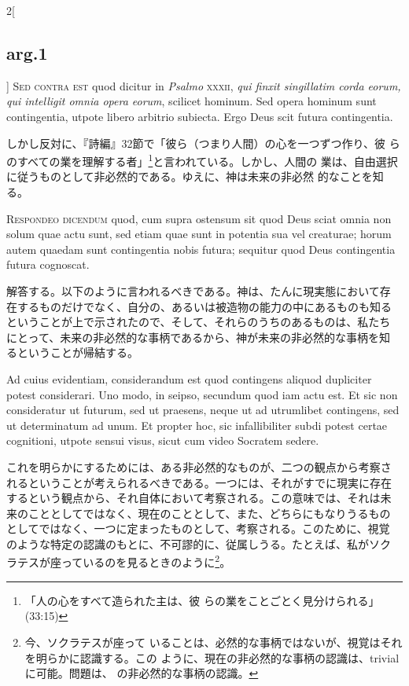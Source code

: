 \documentclass[paper=a4paper,fontsize=10pt,jafontsize=9pt,titlepage]{jlreq}
\begin{document}
\begin{paracol}{2}[\subsection{arg.1}]
{\scshape Sed contra est} quod dicitur in {\itshape Psalmo} {\scshape
xxxii}, {\itshape qui finxit singillatim corda eorum, qui intelligit
omnia opera eorum}, scilicet hominum. Sed opera hominum sunt
contingentia, utpote libero arbitrio subiecta. Ergo Deus scit futura
contingentia.

\switchcolumn

しかし反対に、『詩編』32節で「彼ら（つまり人間）の心を一つずつ作り、彼
らのすべての業を理解する者」\footnote{「人の心をすべて造られた主は、彼
らの業をことごとく見分けられる」(33:15)}と言われている。しかし、人間の
業は、自由選択に従うものとして非必然的である。ゆえに、神は未来の非必然
的なことを知る。


{\scshape Respondeo dicendum} quod, cum supra ostensum sit quod Deus
sciat omnia non solum quae actu sunt, sed etiam quae sunt in potentia
sua vel creaturae; horum autem quaedam sunt contingentia nobis futura;
sequitur quod Deus contingentia futura cognoscat.

\switchcolumn

解答する。以下のように言われるべきである。神は、たんに現実態において存
在するものだけでなく、自分の、あるいは被造物の能力の中にあるものも知る
ということが上で示されたので、そして、それらのうちのあるものは、私たち
にとって、未来の非必然的な事柄であるから、神が未来の非必然的な事柄を知
るということが帰結する。

\switchcolumn*

Ad cuius evidentiam, considerandum est quod contingens aliquod
dupliciter potest considerari. Uno modo, in seipso, secundum quod iam
actu est. Et sic non consideratur ut futurum, sed ut praesens, neque
ut ad utrumlibet contingens, sed ut determinatum ad unum. Et propter
hoc, sic infallibiliter subdi potest certae cognitioni, utpote sensui
visus, sicut cum video Socratem sedere.

\switchcolumn

これを明らかにするためには、ある非必然的なものが、二つの観点から考察さ
れるということが考えられるべきである。一つには、それがすでに現実に存在
するという観点から、それ自体において考察される。この意味では、それは未
来のこととしてではなく、現在のこととして、また、どちらにもなりうるもの
としてではなく、一つに定まったものとして、考察される。このために、視覚
のような特定の認識のもとに、不可謬的に、従属しうる。たとえば、私がソク
ラテスが座っているのを見るときのように\footnote{今、ソクラテスが座って
いることは、必然的な事柄ではないが、視覚はそれを明らかに認識する。この
ように、現在の非必然的な事柄の認識は、trivialに可能。問題は、
の非必然的な事柄の認識。}。


\end{paracol}
\end{document}

